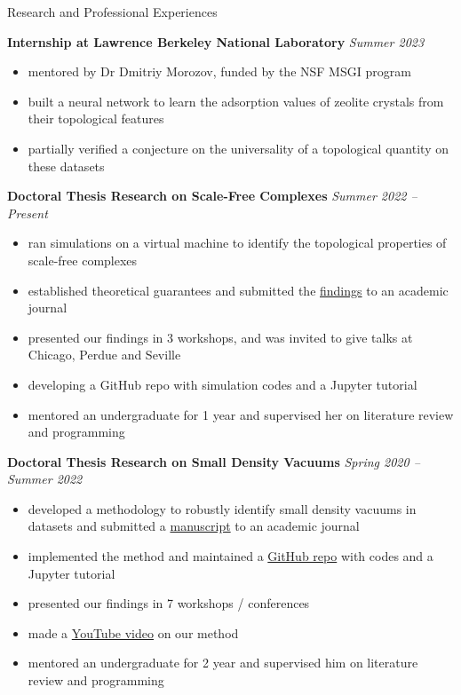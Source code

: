 \documentclass{resume} %
\begin{document}
\begin{rSection}{Research and Professional Experiences}

{\bf Internship at Lawrence Berkeley National Laboratory} \hfill
{\em Summer 2023} 
\begin{itemize}
\item mentored by Dr Dmitriy Morozov, funded by the NSF MSGI program
\item built a neural network to learn the adsorption values of zeolite crystals from their topological features
\item partially verified a conjecture on the universality of a topological quantity on these datasets
\end{itemize}

{\bf Doctoral Thesis Research on Scale-Free Complexes} \hfill {\em Summer 2022 -- Present}
\begin{itemize}
\item ran simulations on a virtual machine to identify the topological properties of scale-free complexes
\item established theoretical guarantees and submitted the \href{https://arxiv.org/abs/2305.11259}{findings} to an academic journal
\item presented our findings in 3 workshops, and was invited to give talks at Chicago, Perdue and Seville
\item 
developing a GitHub repo with simulation codes and a Jupyter tutorial
\item mentored an undergraduate for 1 year and supervised her on literature review and programming
\end{itemize}


{\bf Doctoral Thesis Research on Small Density Vacuums} \hfill {\em Spring 2020 -- Summer 2022}
\begin{itemize}
\item developed a methodology to robustly identify small density vacuums in datasets and submitted a \href{https://arxiv.org/abs/2204.07821}{manuscript} to an academic journal
\item implemented the method and maintained a \href{https://github.com/c-siu/RDAD}{GitHub repo} with codes and a Jupyter tutorial
\item presented our findings in 7 workshops / conferences
\item made a \href{https://www.youtube.com/watch?v=X5c3_bbwQ7Q}{YouTube video} on our method
\item mentored an undergraduate for 2 year and supervised him on literature review and programming
\end{itemize}


\end{rSection}
\end{document}
